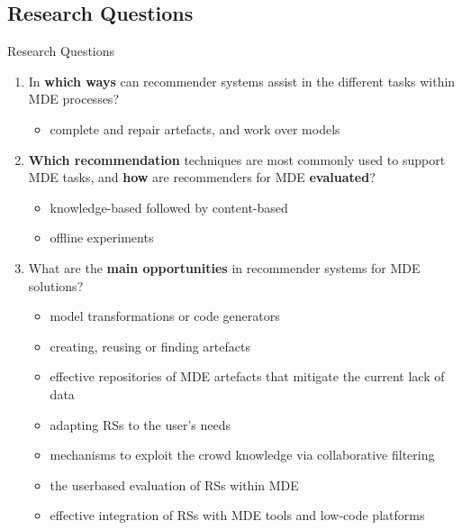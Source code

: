 \documentclass{beamer}
\begin{document}
\subsection{Research Questions}
\begin{frame}{Research Questions}
    \begin{enumerate}
        \item In \textbf{which ways} can recommender systems assist in the different tasks within MDE processes?
        \begin{itemize}
            \item complete and repair artefacts, and work over models
        \end{itemize} 
        \item \textbf{Which recommendation} techniques are most commonly used to support MDE tasks, and \textbf{how} are recommenders for MDE \textbf{evaluated}?
        \begin{itemize}
            \item knowledge-based followed by content-based
            \item offline experiments
        \end{itemize}
        \item What are the \textbf{main opportunities} in recommender systems for MDE solutions?
        \begin{itemize}
            \item model transformations or code generators
            \item creating, reusing or finding artefacts
            \item effective repositories of MDE artefacts that mitigate the current lack of data
            \item adapting RSs to the user's needs
            \item mechanisms to exploit the crowd knowledge via collaborative filtering
            \item the userbased evaluation of RSs within MDE
            \item effective integration of RSs with MDE tools and low-code platforms
        \end{itemize}
    \end{enumerate}
\end{frame}
\end{document}
